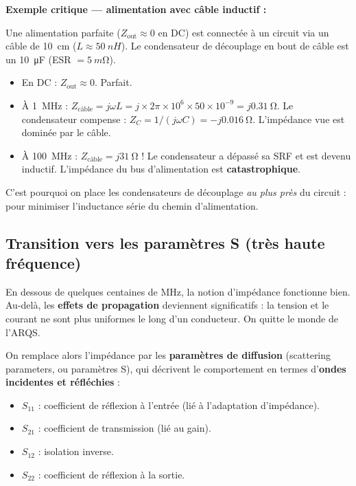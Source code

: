 \documentclass[12pt,a4paper,twoside]{book}
\begin{document}
\begin{pratique}
\textbf{Exemple critique --- alimentation avec câble inductif :}

Une alimentation parfaite ($Z_{\text{out}} \approx 0$ en DC) est connectée à un circuit via un câble de \SI{10}{cm} ($L \approx \SI{50}{nH}$). Le condensateur de découplage en bout de câble est un \SI{10}{\micro F} (ESR $= \SI{5}{m\ohm}$).

\begin{itemize}[nosep]
\item En DC : $Z_{\text{out}} \approx 0$. Parfait.
\item À \SI{1}{MHz} : $Z_{\text{câble}} = j\omega L = j \times 2\pi\times10^6 \times 50\times10^{-9} = j\SI{0.31}{\ohm}$. Le condensateur compense : $Z_C = 1/(j\omega C) = -j\SI{0.016}{\ohm}$. L'impédance vue est dominée par le câble.
\item À \SI{100}{MHz} : $Z_{\text{câble}} = j\SI{31}{\ohm}$ ! Le condensateur a dépassé sa SRF et est devenu inductif. L'impédance du bus d'alimentation est \textbf{catastrophique}.
\end{itemize}
C'est pourquoi on place les condensateurs de découplage \textit{au plus près} du circuit : pour minimiser l'inductance série du chemin d'alimentation.
\end{pratique}

\subsection{Transition vers les paramètres S (très haute fréquence)}

En dessous de quelques centaines de MHz, la notion d'impédance fonctionne bien. Au-delà, les \textbf{effets de propagation} deviennent significatifs : la tension et le courant ne sont plus uniformes le long d'un conducteur. On quitte le monde de l'ARQS.

On remplace alors l'impédance par les \textbf{paramètres de diffusion} (scattering parameters, ou paramètres S), qui décrivent le comportement en termes d'\textbf{ondes incidentes et réfléchies} :

\begin{itemize}[nosep]
\item $S_{11}$ : coefficient de réflexion à l'entrée (lié à l'adaptation d'impédance).
\item $S_{21}$ : coefficient de transmission (lié au gain).
\item $S_{12}$ : isolation inverse.
\item $S_{22}$ : coefficient de réflexion à la sortie.
\end{itemize}
\end{document}
